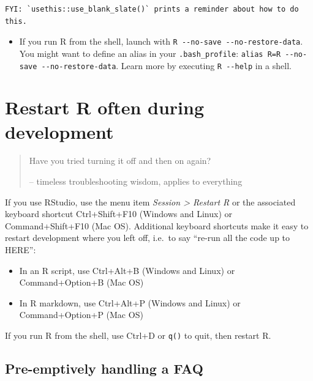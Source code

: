 \documentclass[
  letterpaper,
]{book}
\providecommand{\tightlist}{%
  \setlength{\itemsep}{0pt}\setlength{\parskip}{0pt}}\usepackage{longtable,booktabs,array}
\begin{document}
\begin{verbatim}
FYI: `usethis::use_blank_slate()` prints a reminder about how to do this.
\end{verbatim}

\begin{itemize}
\tightlist
\item
  If you run R from the shell, launch with
  \texttt{R\ -\/-no-save\ -\/-no-restore-data}. You might want to define
  an alias in your \texttt{.bash\_profile}:
  \texttt{alias\ R=\textquotesingle{}R\ -\/-no-save\ -\/-no-restore-data\textquotesingle{}}.
  Learn more by executing \texttt{R\ -\/-help} in a shell.
\end{itemize}

\hypertarget{restart-r-often-during-development}{%
\section*{Restart R often during
development}\label{restart-r-often-during-development}}

\begin{quote}
Have you tried turning it off and then on again?

-- timeless troubleshooting wisdom, applies to everything
\end{quote}

If you use RStudio, use the menu item \emph{Session \textgreater{}
Restart R} or the associated keyboard shortcut Ctrl+Shift+F10 (Windows
and Linux) or Command+Shift+F10 (Mac OS). Additional keyboard shortcuts
make it easy to restart development where you left off, i.e.~to say
``re-run all the code up to HERE'':

\begin{itemize}
\tightlist
\item
  In an R script, use Ctrl+Alt+B (Windows and Linux) or Command+Option+B
  (Mac OS)
\item
  In R markdown, use Ctrl+Alt+P (Windows and Linux) or Command+Option+P
  (Mac OS)
\end{itemize}

If you run R from the shell, use Ctrl+D or \texttt{q()} to quit, then
restart R.

\hypertarget{pre-emptively-handling-a-faq}{%
\subsection*{Pre-emptively handling a
FAQ}\label{pre-emptively-handling-a-faq}}
\end{document}
